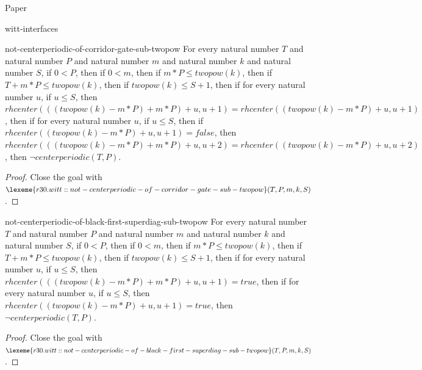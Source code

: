 \begin{lexlean}{Paper}
\begin{section}{witt-interfaces}
  \begin{theorem}{not-centerperiodic-of-corridor-gate-sub-twopow}
  For every natural number \(T\) and natural number \(P\) and natural number \(m\) and natural number \(k\) and natural number \(S\), if \(0 < P\), then if \(0 < m\), then if \(m * P ≤ twopow(k)\), then if \(T + m * P ≤ twopow(k)\), then if \(twopow(k) ≤ S + 1\), then if for every natural number \(u\), if \(u ≤ S\), then \(rhcenter(((twopow(k) - m * P) + m * P) + u, u + 1) = rhcenter((twopow(k) - m * P) + u, u + 1)\), then if for every natural number \(u\), if \(u ≤ S\), then if \(rhcenter((twopow(k) - m * P) + u, u + 1) = false\), then \(rhcenter(((twopow(k) - m * P) + m * P) + u, u + 2) = rhcenter((twopow(k) - m * P) + u, u + 2)\), then \(¬ centerperiodic(T, P)\).
  \begin{proof}
  Close the goal with \(\lexeme{r30.witt::not-centerperiodic-of-corridor-gate-sub-twopow}(T, P, m, k, S)\).
  \end{proof}
  \end{theorem}

  \begin{theorem}{not-centerperiodic-of-black-first-superdiag-sub-twopow}
  For every natural number \(T\) and natural number \(P\) and natural number \(m\) and natural number \(k\) and natural number \(S\), if \(0 < P\), then if \(0 < m\), then if \(m * P ≤ twopow(k)\), then if \(T + m * P ≤ twopow(k)\), then if \(twopow(k) ≤ S + 1\), then if for every natural number \(u\), if \(u ≤ S\), then \(rhcenter(((twopow(k) - m * P) + m * P) + u, u + 1) = true\), then if for every natural number \(u\), if \(u ≤ S\), then \(rhcenter((twopow(k) - m * P) + u, u + 1) = true\), then \(¬ centerperiodic(T, P)\).
  \begin{proof}
  Close the goal with \(\lexeme{r30.witt::not-centerperiodic-of-black-first-superdiag-sub-twopow}(T, P, m, k, S)\).
  \end{proof}
  \end{theorem}


\end{section}
\end{lexlean}
